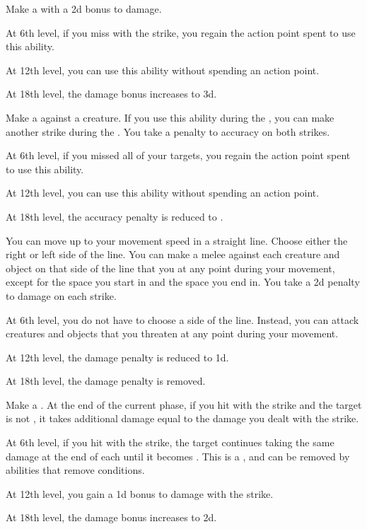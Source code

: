 {             Make a  with a \plus2d bonus to damage.
            \par At 6th level, if you miss with the strike, you regain the action point spent to use this ability.
            \par At 12th level, you can use this ability without spending an action point.
            \par At 18th level, the damage bonus increases to \plus3d.

             Make a  against a creature.
            If you use this ability during the , you can make another strike during the .
            You take a  penalty to accuracy on both strikes.
            \par At 6th level, if you missed all of your targets, you regain the action point spent to use this ability.
            \par At 12th level, you can use this ability without spending an action point.
            \par At 18th level, the accuracy penalty is reduced to .

             You can move up to your movement speed in a straight line.
            Choose either the right or left side of the line.
            You can make a melee  against each creature and object on that side of the line that you  at any point during your movement, except for the space you start in and the space you end in.
            You take a \minus2d penalty to damage on each strike.
            \par At 6th level, you do not have to choose a side of the line.
            Instead, you can attack creatures and objects that you threaten at any point during your movement.
            \par At 12th level, the damage penalty is reduced to \minus1d.
            \par At 18th level, the damage penalty is removed.

             Make a .
            At the end of the current phase, if you hit with the strike and the target is not , it takes additional damage equal to the damage you dealt with the strike.
            \par At 6th level, if you hit with the strike, the target continues taking the same damage at the end of each  until it becomes .
            This is a , and can be removed by abilities that remove conditions.
            \par At 12th level, you gain a \plus1d bonus to damage with the strike.
            \par At 18th level, the damage bonus increases to \plus2d.

}
